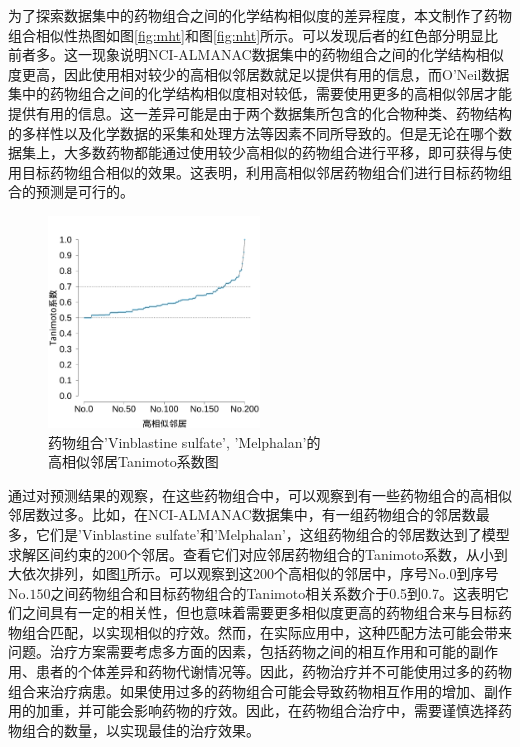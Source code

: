 为了探索数据集中的药物组合之间的化学结构相似度的差异程度，本文制作了药物组合相似性热图如图\ref{fig:mht}和图\ref{fig:nht}所示。可以发现后者的红色部分明显比前者多。这一现象说明NCI-ALMANAC数据集中的药物组合之间的化学结构相似度更高，因此使用相对较少的高相似邻居数就足以提供有用的信息，而O'Neil数据集中的药物组合之间的化学结构相似度相对较低，需要使用更多的高相似邻居才能提供有用的信息。这一差异可能是由于两个数据集所包含的化合物种类、药物结构的多样性以及化学数据的采集和处理方法等因素不同所导致的。但是无论在哪个数据集上，大多数药物都能通过使用较少高相似的药物组合进行平移，即可获得与使用目标药物组合相似的效果。这表明，利用高相似邻居药物组合们进行目标药物组合的预测是可行的。

\begin{figure}[htbp!]
\centering
\includegraphics[width=0.5\textwidth]{figures/n_exp.pdf}
\caption{药物组合'Vinblastine sulfate', 'Melphalan'的\\高相似邻居Tanimoto系数图\label{fig:nco}}
\end{figure}

通过对预测结果的观察，在这些药物组合中，可以观察到有一些药物组合的高相似邻居数过多。比如，在NCI-ALMANAC数据集中，有一组药物组合的邻居数最多，它们是'Vinblastine sulfate'和'Melphalan'，这组药物组合的邻居数达到了模型求解区间约束的200个邻居。查看它们对应邻居药物组合的Tanimoto系数，从小到大依次排列，如图\ref{fig:nco}所示。可以观察到这200个高相似的邻居中，序号$\mathrm{No.0}$到序号$\mathrm{No.150}$之间药物组合和目标药物组合的Tanimoto相关系数介于0.5到0.7。这表明它们之间具有一定的相关性，但也意味着需要更多相似度更高的药物组合来与目标药物组合匹配，以实现相似的疗效。然而，在实际应用中，这种匹配方法可能会带来问题。治疗方案需要考虑多方面的因素，包括药物之间的相互作用和可能的副作用、患者的个体差异和药物代谢情况等。因此，药物治疗并不可能使用过多的药物组合来治疗病患。如果使用过多的药物组合可能会导致药物相互作用的增加、副作用的加重，并可能会影响药物的疗效。因此，在药物组合治疗中，需要谨慎选择药物组合的数量，以实现最佳的治疗效果。

